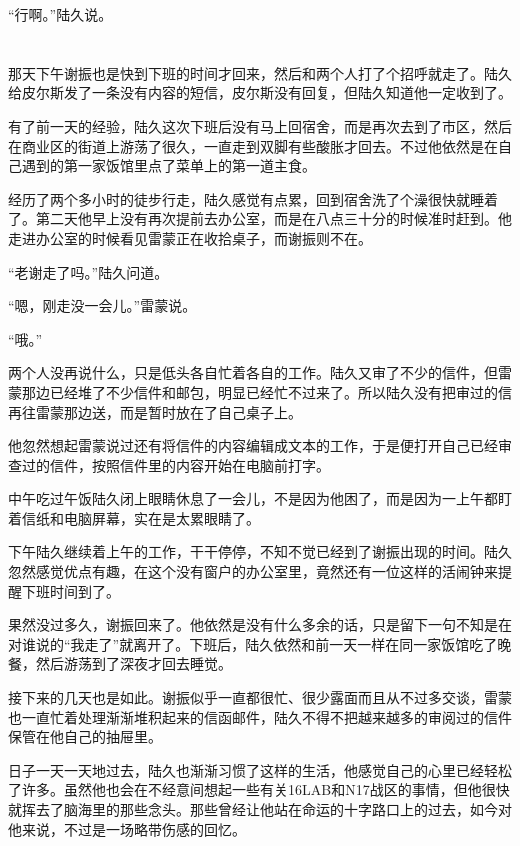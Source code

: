 “行啊。”陆久说。



\section*{}

那天下午谢振也是快到下班的时间才回来，然后和两个人打了个招呼就走了。陆久给皮尔斯发了一条没有内容的短信，皮尔斯没有回复，但陆久知道他一定收到了。

有了前一天的经验，陆久这次下班后没有马上回宿舍，而是再次去到了市区，然后在商业区的街道上游荡了很久，一直走到双脚有些酸胀才回去。不过他依然是在自己遇到的第一家饭馆里点了菜单上的第一道主食。

经历了两个多小时的徒步行走，陆久感觉有点累，回到宿舍洗了个澡很快就睡着了。第二天他早上没有再次提前去办公室，而是在八点三十分的时候准时赶到。他走进办公室的时候看见雷蒙正在收拾桌子，而谢振则不在。

“老谢走了吗。”陆久问道。

“嗯，刚走没一会儿。”雷蒙说。

“哦。”

两个人没再说什么，只是低头各自忙着各自的工作。陆久又审了不少的信件，但雷蒙那边已经堆了不少信件和邮包，明显已经忙不过来了。所以陆久没有把审过的信再往雷蒙那边送，而是暂时放在了自己桌子上。

他忽然想起雷蒙说过还有将信件的内容编辑成文本的工作，于是便打开自己已经审查过的信件，按照信件里的内容开始在电脑前打字。

中午吃过午饭陆久闭上眼睛休息了一会儿，不是因为他困了，而是因为一上午都盯着信纸和电脑屏幕，实在是太累眼睛了。

下午陆久继续着上午的工作，干干停停，不知不觉已经到了谢振出现的时间。陆久忽然感觉优点有趣，在这个没有窗户的办公室里，竟然还有一位这样的活闹钟来提醒下班时间到了。

果然没过多久，谢振回来了。他依然是没有什么多余的话，只是留下一句不知是在对谁说的“我走了”就离开了。下班后，陆久依然和前一天一样在同一家饭馆吃了晚餐，然后游荡到了深夜才回去睡觉。

接下来的几天也是如此。谢振似乎一直都很忙、很少露面而且从不过多交谈，雷蒙也一直忙着处理渐渐堆积起来的信函邮件，陆久不得不把越来越多的审阅过的信件保管在他自己的抽屉里。

日子一天一天地过去，陆久也渐渐习惯了这样的生活，他感觉自己的心里已经轻松了许多。虽然他也会在不经意间想起一些有关16LAB和N17战区的事情，但他很快就挥去了脑海里的那些念头。那些曾经让他站在命运的十字路口上的过去，如今对他来说，不过是一场略带伤感的回忆。

